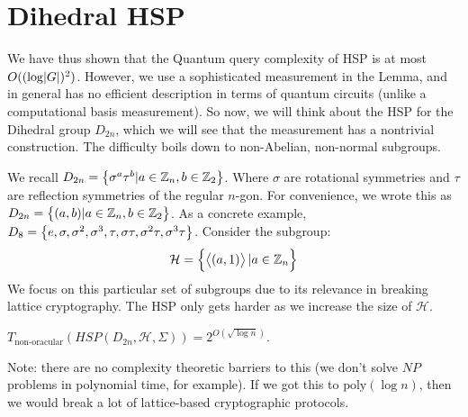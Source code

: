 \section{Dihedral HSP}
We have thus shown that the Quantum query complexity of HSP is at most $O((\log\lvert G \rvert)^2)$. However, we use a sophisticated measurement in the Lemma, and in general has no efficient description in terms of quantum circuits (unlike a computational basis measurement). So now, we will think about the HSP for the Dihedral group $D_{2n}$, which we will see that the measurement has a nontrivial construction. The difficulty boils down to non-Abelian, non-normal subgroups.

We recall $D_{2n} = \set{\sigma^a\tau^b \vert a \in \mathbb{Z}_n, b \in \mathbb{Z}_2}$. Where $\sigma$ are rotational symmetries and $\tau$ are reflection symmetries of the regular $n$-gon. For convenience, we wrote this as $D_{2n} = \set{(a, b) \vert a \in \mathbb{Z}_n, b \in \mathbb{Z}_2}$. As a concrete example, $D_{8} = \set{e, \sigma, \sigma^2, \sigma^3, \tau, \sigma\tau, \sigma^2\tau, \sigma^3\tau}$. Consider the subgroup:
\begin{equation}
    \mathcal{H} = \set{\left< (a, 1) \right> \vert a \in \mathbb{Z}_n} 
\end{equation}
We focus on this particular set of subgroups due to its relevance in breaking lattice cryptography. The HSP only gets harder as we increase the size of $\mathcal{H}$.

\begin{propbox}{}
    $T_{\text{non-oracular}}(HSP(D_{2n}, \mathcal{H}, \Sigma)) = 2^{O(\sqrt{\log n})}$. 
\end{propbox}
Note: there are no complexity theoretic barriers to this (we don't solve $NP$ problems in polynomial time, for example). If we got this to $\text{poly}(\log n)$, then we would break a lot of lattice-based cryptographic protocols.

